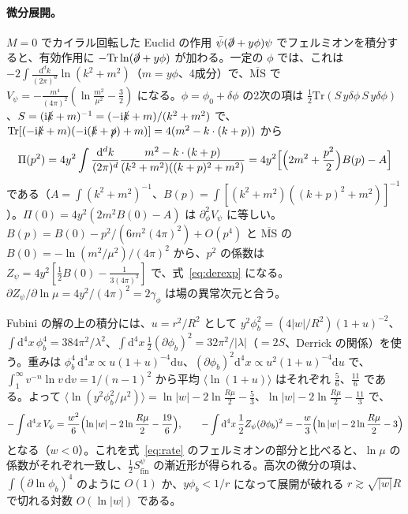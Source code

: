 \documentclass[a4paper,10pt]{ltjsarticle}
\newcommand{\dd}{\mathrm{d}}
\newcommand{\MSbar}{\overline{\mathrm{MS}}}
\begin{document}
\paragraph{微分展開。}$M=0$ でカイラル回転した Euclid の作用 $\bar\psi(\slashed\partial+y\phi)\psi$ でフェルミオンを積分すると、有効作用に $-\mathrm{Tr}\ln(\slashed\partial+y\phi)$ が加わる。一定の $\phi$ では、これは $-2\int\frac{\dd^dk}{(2\pi)^d}\ln(k^2+m^2)$（$m=y\phi$、4成分）で、$\MSbar$ で $V_\psi=-\frac{m^4}{(4\pi)^2}(\ln\frac{m^2}{\mu^2}-\frac32)$ になる。$\phi=\phi_0+\delta\phi$ の2次の項は $\frac12\mathrm{Tr}(S\,y\delta\phi\,S\,y\delta\phi)$、$S=(\mathrm i\slashed k+m)^{-1}=(-\mathrm i\slashed k+m)/(k^2+m^2)$ で、$\mathrm{Tr}[(-\mathrm i\slashed k+m)(-\mathrm i(\slashed k+\slashed p)+m)]=4(m^2-k\cdot(k+p))$ から
\begin{equation*}
\Pi(p^2)=4y^2\int\frac{\dd^dk}{(2\pi)^d}\frac{m^2-k\cdot(k+p)}{(k^2+m^2)((k+p)^2+m^2)}=4y^2\Bigl[\Bigl(2m^2+\frac{p^2}{2}\Bigr)B(p)-A\Bigr]
\end{equation*}
である（$A=\int(k^2+m^2)^{-1}$、$B(p)=\int[(k^2+m^2)((k+p)^2+m^2)]^{-1}$）。$\Pi(0)=4y^2(2m^2B(0)-A)$ は $\partial_\phi^2V_\psi$ に等しい。$B(p)=B(0)-p^2/(6m^2(4\pi)^2)+O(p^4)$ と $\MSbar$ の $B(0)=-\ln(m^2/\mu^2)/(4\pi)^2$ から、$p^2$ の係数は $Z_\psi=4y^2[\frac12B(0)-\frac{1}{3(4\pi)^2}]$ で、式~\eqref{eq:derexp} になる。$\partial Z_\psi/\partial\ln\mu=4y^2/(4\pi)^2=2\gamma_\phi$ は場の異常次元と合う。

Fubini の解の上の積分には、$u=r^2/R^2$ として $y^2\phi_b^2=(4|w|/R^2)(1+u)^{-2}$、$\int\dd^4x\,\phi_b^4=384\pi^2/\lambda^2$、$\int\dd^4x\,\frac12(\partial\phi_b)^2=32\pi^2/|\lambda|$（$=2S$、Derrick の関係）を使う。重みは $\phi_b^4\,\dd^4x\propto u(1+u)^{-4}\dd u$、$(\partial\phi_b)^2\dd^4x\propto u^2(1+u)^{-4}\dd u$ で、$\int_1^\infty v^{-n}\ln v\,\dd v=1/(n-1)^2$ から平均 $\langle\ln(1+u)\rangle$ はそれぞれ $\frac56$、$\frac{11}{6}$ である。よって $\langle\ln(y^2\phi_b^2/\mu^2)\rangle=\ln|w|-2\ln\frac{R\mu}{2}-\frac53$、$\ln|w|-2\ln\frac{R\mu}{2}-\frac{11}{3}$ で、
\begin{equation*}
-\int\dd^4x\,V_\psi=\frac{w^2}{6}\Bigl(\ln|w|-2\ln\frac{R\mu}{2}-\frac{19}{6}\Bigr),\qquad
-\int\dd^4x\,\frac12Z_\psi(\partial\phi_b)^2=-\frac w3\Bigl(\ln|w|-2\ln\frac{R\mu}{2}-3\Bigr)
\end{equation*}
となる（$w<0$）。これを式~\eqref{eq:rate} のフェルミオンの部分と比べると、$\ln\mu$ の係数がそれぞれ一致し、$\frac12S^\psi_{\mathrm{fin}}$ の漸近形が得られる。高次の微分の項は、$\int(\partial\ln\phi_b)^4$ のように $O(1)$ か、$y\phi_b<1/r$ になって展開が破れる $r\gtrsim\sqrt{|w|}R$ で切れる対数 $O(\ln|w|)$ である。
\end{document}
